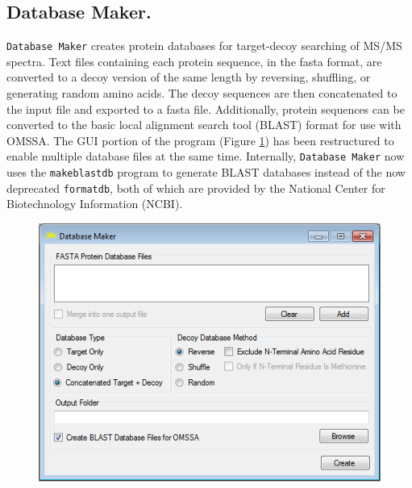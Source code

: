 \subsection*{Database Maker.}
\texttt{Database Maker} creates protein databases for target-decoy searching of MS/MS spectra. Text files containing each protein sequence, in the fasta format, are converted to a decoy version of the same length by reversing, shuffling, or generating random amino acids.\cite{targetdecoy,targetdecoycomp,qscore} The decoy sequences are then concatenated to the input file and exported to a fasta file. Additionally, protein sequences can be converted to the basic local alignment search tool (BLAST) format for use with OMSSA.\cite{blast} The GUI portion of the program (Figure \ref{fig:databasemaker}) has been restructured to enable multiple database files at the same time. Internally, \texttt{Database Maker} now uses the \texttt{makeblastdb} program to generate BLAST databases instead of the now deprecated \texttt{formatdb}, both of which are provided by the National Center for Biotechnology Information (NCBI).
\begin{figure}[p]
	\centering
	\includegraphics[width=\columnwidth]{csmsl/databasemaker.png}
	\label{fig:databasemaker}
\end{figure}

